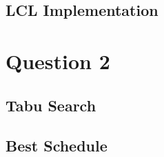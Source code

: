 \documentclass[fleqn]{article}
\begin{document}
  \subsection{LCL Implementation}

  \section{Question 2}
  \subsection{Tabu Search}

  \subsection{Best Schedule}
\end{document}
